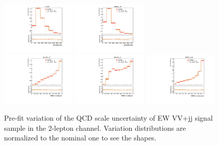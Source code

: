 \begin{figure}[H]
\begin{center}
 \includegraphics[width=0.32\textwidth,keepaspectratio]{figures/syst/QCDScale/EW6llqq_0ptag1pfat0pjet_0ptv_CRVjet_MTagMerJets_SysTheoryQCD_VBS__1up_Norm.pdf}
 \includegraphics[width=0.32\textwidth,keepaspectratio]{figures/syst/QCDScale/EW6llqq_0ptag2pjet_0ptv_CRVjet_Fid_MTagResJets_SysTheoryQCD_VBS__1up_Norm.pdf}
 \\ 
 \includegraphics[width=0.32\textwidth,keepaspectratio]{figures/syst/QCDScale/EW6llqq_0ptag1pfat0pjet_0ptv_SRVBS_HP_RNNScoreMerged_SysTheoryQCD_VBS__1up_Norm.pdf}
 \includegraphics[width=0.32\textwidth,keepaspectratio]{figures/syst/QCDScale/EW6llqq_0ptag1pfat0pjet_0ptv_SRVBS_LP_RNNScoreMerged_SysTheoryQCD_VBS__1up_Norm.pdf}
 \includegraphics[width=0.32\textwidth,keepaspectratio]{figures/syst/QCDScale/EW6llqq_0ptag2pjet_0ptv_SRVBS_Fid_RNNScoreResolved_SysTheoryQCD_VBS__1up_Norm.pdf}
 \caption[f]{
Pre-fit variation of the QCD scale uncertainty of EW VV+jj signal sample in the 2-lepton channel.  Variation distributions are normalized to the nominal one to see the shapes.
}
\label{fig:QCDSignal}
\end{center}
\end{figure}
